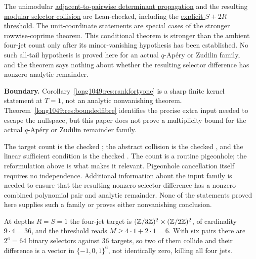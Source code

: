 \documentclass[11pt]{article}
\begin{document}
\noindent The unimodular
\href{https://github.com/wcook04/plectis-erdos/blob/0cfa24a7fe555d75a9d9e7f119da4720a88c1396/ErdosProblems/Erdos1049/BezoutPluckerJets.lean\#L191}{adjacent-to-pairwise determinant propagation}
and the resulting
\href{https://github.com/wcook04/plectis-erdos/blob/0cfa24a7fe555d75a9d9e7f119da4720a88c1396/ErdosProblems/Erdos1049/BezoutPluckerJets.lean\#L280}{modular selector collision}
are Lean-checked, including the
\href{https://github.com/wcook04/plectis-erdos/blob/0cfa24a7fe555d75a9d9e7f119da4720a88c1396/ErdosProblems/Erdos1049/BezoutPluckerJets.lean\#L299}{explicit $S+2R$ threshold}.
The unit-coordinate statements are special cases of the stronger
rowwise-coprime theorem.
This conditional theorem is stronger than the ambient four-jet count only
after its minor-vanishing hypothesis has been established.  No such all-tail
hypothesis is proved here for an actual $q$-Ap\'ery or Zudilin family, and the
theorem says nothing about whether the resulting selector difference has
nonzero analytic remainder.

\noindent\textbf{Boundary.}
Corollary~\ref{long1049:res:rankfortyone} is a sharp finite kernel statement at
$T=1$, not an analytic nonvanishing theorem.  Theorem~\ref{long1049:res:boundedfibre}
identifies the precise extra input needed to escape the nullspace, but this
paper does not prove a multiplicity bound for the actual $q$-Ap\'ery or
Zudilin remainder family.

\noindent The target count is the checked
; the abstract collision is the checked
, and the linear sufficient condition is the checked
.  The count is a routine pigeonhole; the reformulation
above is what makes it relevant.  Pigeonhole cancellation itself requires no
independence.  Additional information about the input family is needed to
ensure that the resulting nonzero selector difference has a nonzero combined
polynomial pair and analytic remainder.  None of the statements proved here
supplies such a family or proves either nonvanishing conclusion.

\begin{example}\label{long1049:ex:jetcount}
At depths \(R=S=1\) the four-jet target is
\((\mathbb{Z}/3\mathbb{Z})^2\times(\mathbb{Z}/2\mathbb{Z})^2\), of cardinality \(9\cdot4=36\), and the threshold
reads \(M\ge4\cdot1+2\cdot1=6\).  With six pairs there are \(2^{6}=64\) binary
selectors against \(36\) targets, so two of them collide and their difference
is a vector in \(\{-1,0,1\}^{6}\), not identically zero, killing all four jets.
\end{example}
\end{document}
